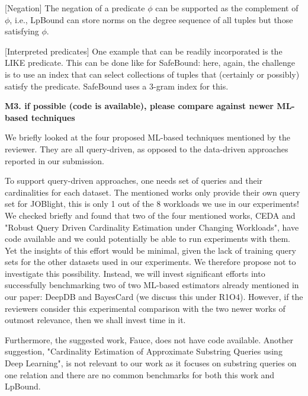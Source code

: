{[Negation] The negation of a predicate $\phi$ can be supported as the complement of $\phi$, i.e., LpBound can store norms on the degree sequence of all tuples but those satisfying $\phi$.

[Interpreted predicates] One example that can be readily incorporated is the LIKE predicate. This can be done like for SafeBound: here, again, the challenge is to use an index that can select collections of tuples that (certainly or possibly) satisfy the predicate. SafeBound uses a 3-gram index for this.

}

\vspace{0.5em}\noindent
\textbf{
M3. if possible (code is available), please compare against newer ML-based techniques 
}

{
\color{blue}
We briefly looked at the four proposed ML-based techniques mentioned by the reviewer. They are all query-driven, as opposed to the data-driven approaches reported in our submission. 

To support query-driven approaches, one needs set of  queries and their cardinalities for each dataset. The mentioned works only provide their own query set for JOBlight, this is only 1 out of the 8 workloads we use in our experiments! We checked briefly and found that two of the four mentioned works, CEDA and "Robust Query Driven Cardinality Estimation under Changing Workloads", have code available and we could potentially be able to run experiments with them.  Yet the insights of this effort would be minimal, given the lack of training query sets for the other datasets used in our experiments. We therefore propose not to investigate this possibility. Instead, we will invest significant efforts into successfully benchmarking two of two ML-based estimators already mentioned in our paper: DeepDB and BayesCard (we discuss this under R1O4).
However, if the reviewers consider this experimental comparison with the two newer works of outmost relevance, then we shall invest time in it.

Furthermore, the suggested work, Fauce, does not have code available. Another suggestion, "Cardinality Estimation of Approximate Substring Queries using Deep Learning", is not relevant to our work as it focuses on substring queries on one relation and there are no common benchmarks for both this work and LpBound.
}


